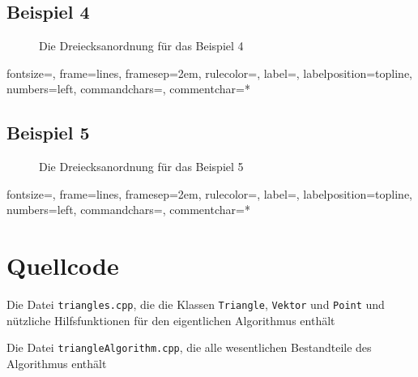 \documentclass[a4paper, notitlepage, 12pt]{scrartcl}
\newenvironment{longlisting}{\captionsetup{type=listing}}{}
\begin{document}
\subsection{Beispiel 4}
\begin{figure}[H] 
	
	\caption{Die Dreiecksanordnung für das Beispiel 4}
\end{figure}
%
{fontsize=\footnotesize,
	frame=lines,  %
	framesep=2em, %
	rulecolor=\color{Gray},
	label=,
	labelposition=topline,
	numbers=left,
	commandchars=\|\(\), %
	commentchar=*        %
}
\subsection{Beispiel 5}
\begin{figure}[H] 
	
	\caption{Die Dreiecksanordnung für das Beispiel 5}
\end{figure}
%
{fontsize=\footnotesize,
	frame=lines,  %
	framesep=2em, %
	rulecolor=\color{Gray},
	label=,
	labelposition=topline,
	numbers=left,
	commandchars=\|\(\), %
	commentchar=*        %
}
 \section{Quellcode}
 \renewcommand{\listingscaption}{Quellcode}
 
 \begin{longlisting}
 	
 	\caption{Die Datei \texttt{triangles.cpp}, die die Klassen \texttt{Triangle}, \texttt{Vektor} und \texttt{Point} und nützliche Hilfsfunktionen für den eigentlichen Algorithmus enthält}
 	
 	\caption{Die Datei \texttt{triangleAlgorithm.cpp}, die alle wesentlichen Bestandteile des Algorithmus enthält}
 \end{longlisting}
 
 
\end{document}
